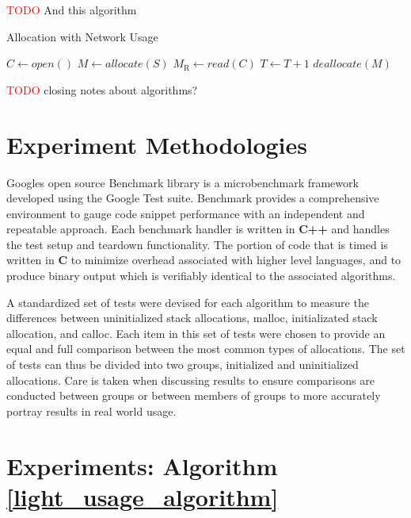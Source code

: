 \documentclass[letterpaper, 10 pt, conference]{ieeeconf}  %
\newcommand*\todo[0]{\textcolor{red}{TODO }}
\begin{document}
\todo And this algorithm

\begin{algorithm}[h]
  \caption{Allocation with Network Usage}
  \begin{algorithmic}
    \STATE $C \leftarrow open()$
      \STATE $M \leftarrow allocate(S)$
      \STATE $M_\text{R} \leftarrow read(C)$
      \STATE $T \leftarrow T + 1$
      \STATE $deallocate(M)$
    \ENDWHILE
  \end{algorithmic}
  \label{network_usage_algorithm}
\end{algorithm}

\todo closing notes about algorithms?

\section{Experiment Methodologies}
Googles open source Benchmark library is a microbenchmark framework developed using the Google Test suite. Benchmark provides a comprehensive environment to gauge code snippet performance with an independent and repeatable approach.
Each benchmark handler is written in \textbf{C++} and handles the test setup and teardown functionality.
The portion of code that is timed is written in \textbf{C} to minimize overhead associated with higher level languages, and to produce binary output which is verifiably identical to the associated algorithms.

A standardized set of tests were devised for each algorithm to measure the differences between uninitialized stack allocations, malloc, initializated stack allocation, and calloc.
Each item in this set of tests were chosen to provide an equal and full comparison between the most common types of allocations.
The set of tests can thus be divided into two groups, initialized and uninitialized allocations.
Care is taken when discussing results to ensure comparisons are conducted between groups or between members of groups to more accurately portray results in real world usage. 



\section{Experiments: Algorithm \ref{light_usage_algorithm}}
\end{document}
